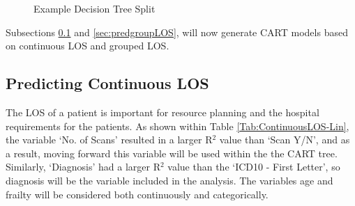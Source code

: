\documentclass[../thesis.tex]{subfiles}
\begin{document}
\begin{figure}[h!]
\centering
{}
    \caption{Example Decision Tree Split}
    \label{Fig:ExampleDT}
\end{figure}


Subsections \ref{sec:predcontLOS} and \ref{sec:predgroupLOS}, will now generate CART models based on continuous LOS and grouped LOS.
\subsection{Predicting Continuous LOS}\label{sec:predcontLOS}
The LOS of a patient is important for resource planning and the hospital requirements for the patients. As shown within Table \ref{Tab:ContinuousLOS-Lin}, the variable `No. of Scans' resulted in a larger R$^2$ value than `Scan Y/N', and as a result, moving forward this variable will be used within the the CART tree. Similarly, `Diagnosis' had a larger R$^2$ value than the `ICD10 - First Letter', so diagnosis will be the variable included in the analysis. The variables age and frailty will be considered both continuously and categorically. 
\end{document}
